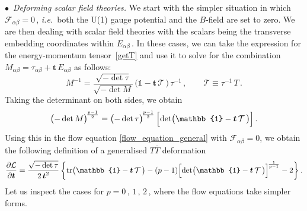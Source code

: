 \documentclass[11pt]{article}
\newcommand{\be}{\begin{equation}}
\newcommand{\ee}{\end{equation}}
\newcommand{\CT}{\mathcal{T}}
\newcommand{\tr}{\text{tr}}
\renewcommand{\emph}[1]{\textit{#1}}
\newcommand{\lambdap}{\boldsymbol{t}}
\begin{document}
\vspace{3mm}

\noindent $\bullet$~\emph{Deforming scalar field theories.} We start with 
the simpler situation in which $\mathcal{F}_{\alpha\beta} = 0$\,, \emph{i.e.}~both the U(1) gauge potential and the $B$-field are set to zero. We are then dealing with scalar field theories with the scalars being the transverse embedding coordinates within $E_{\alpha\beta}$\,.
In these cases, we can take the expression for the energy-momentum tensor~\eqref{getT} and use it to solve for the combination $M_{\alpha\beta} = \tau_{\alpha\beta} + \lambdap \, E_{\alpha\beta}$ as follows:
%
\be
    M^{-1} = \frac{\sqrt{-\det \tau}}{\sqrt{-\det M}} \, \bigl( \mathbb{1} - \lambdap \, \CT \, \bigr) \, \tau^{-1} \,,
        \qquad%
    \CT \equiv \tau^{-1} \, T\,.
\ee
%
Taking the determinant on both sides, we obtain
%
\be
    \bigl(-\det M \bigr)^{\!\frac{p-1}{2}} = \bigl( - \det \tau \bigr)^{\!\frac{p-1}{2}}\,  \Bigl[ \det \bigl(\mathbb{1} - \lambdap \, \CT \, \bigr) \Bigr]\,.
\label{detM} 
\ee
Using this in the flow equation \eqref{flow_equation_general} with $\mathcal{F}_{\alpha \beta}=0$, we obtain the following definition of a generalised $T\bar{T}$ deformation
%
\be \label{genTTflow_noF}
    \frac{\partial \mathcal{L}}{\partial \lambdap} 
= \frac{\sqrt{- \det \tau}}{2 \, \lambdap^2} \left\{
\tr \bigl( \mathbb{1} - \lambdap \, \CT \, \bigr) 
- (p-1) \Bigl[ \det \bigl( \mathbb{1} - \lambdap \, \CT \, \bigr) \Bigr]^{\!\frac{1}{p-1}} - 2
\right\}.
\ee
%
Let us inspect the cases for $p = 0\,,\, 1\,, \, 2$\,, where the flow equations take simpler forms. 
%
\end{document}
